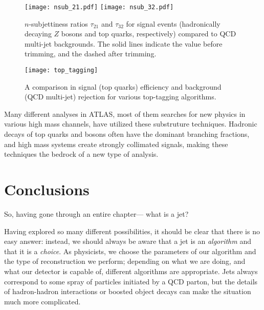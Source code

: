 
\begin{figure}
\centering
\texttt{[image: nsub\_21.pdf]}
\texttt{[image: nsub\_32.pdf]}
\label{fig:jets:nsub}
\caption{$n$-subjettiness ratios $\tau_{21}$ and $\tau_{32}$ for signal events (hadronically decaying $Z$ bosons and top quarks, respectively) compared to QCD multi-jet backgrounds. The solid lines indicate the value before trimming, and the dashed after trimming.}
\end{figure}




\begin{figure}
\centering
\texttt{[image: top\_tagging]}
\label{fig:jets:top_tagging}
\caption{A comparison in signal (top quarks) efficiency and background (QCD multi-jet) rejection for various top-tagging algorithms.}
\end{figure}





Many different analyses in ATLAS, most of them searches for new physics in various high mass channels, have utilized these substruture techniques. Hadronic decays of top quarks and bosons often have the dominant branching fractions, and high mass systems create strongly collimated signals, making these techniques the bedrock of a new type of analysis. 

\section{Conclusions}

So, having gone through an entire chapter--- what is a jet?

Having explored so many different possibilities, it should be clear that there is no easy answer: instead, we should always be aware that a jet is an \textit{algorithm} and that it is a \textit{choice}. As physicists, we choose the parameters of our algorithm and the type of reconstruction we perform; depending on what we are doing, and what our detector is capable of, different algorithms are appropriate. Jets always correspond to some spray of particles initiated by a QCD parton, but the details of hadron-hadron interactions or boosted object decays can make the situation much more complicated.

